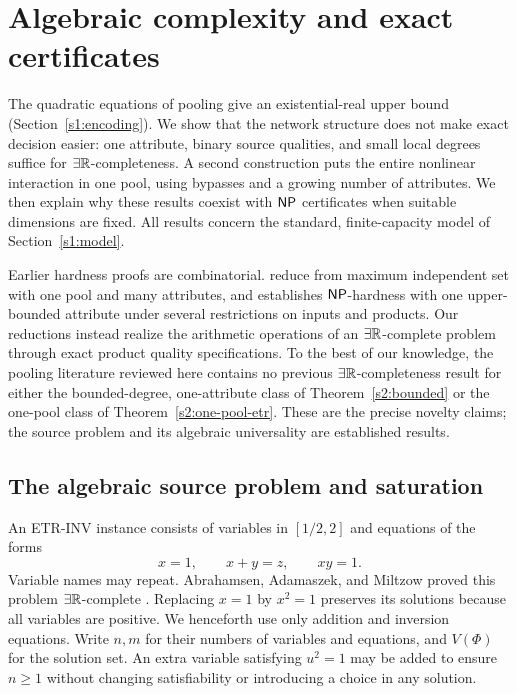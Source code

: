\section{Algebraic complexity and exact certificates}\label{s2:algebraic}

The quadratic equations of pooling give an existential-real upper bound
(Section~\ref{s1:encoding}). We show that the network structure does not
make exact decision easier: one attribute, binary source qualities, and
small local degrees suffice for $\exists\mathbb R$-completeness. A second
construction puts the entire nonlinear interaction in one pool, using
bypasses and a growing number of attributes. We then explain why these
results coexist with $\mathsf{NP}$ certificates when suitable dimensions are
fixed. All results concern the standard, finite-capacity model of
Section~\ref{s1:model}.

Earlier hardness proofs are combinatorial.
\citet{alfaki2013-strong-formulations-for-the-pooling} reduce from
maximum independent set with one pool and many attributes, and
\citet[Theorems~3--5]{haugland2016-the-computational-complexity-of-the}
establishes $\mathsf{NP}$-hardness with one upper-bounded attribute under several
restrictions on inputs and products. Our reductions instead realize the
arithmetic operations of an $\exists\mathbb R$-complete problem through exact product
quality specifications. To the best of our knowledge, the pooling
literature reviewed here contains no previous $\exists\mathbb R$-completeness result
for either the bounded-degree, one-attribute class of
Theorem~\ref{s2:bounded} or the one-pool class of
Theorem~\ref{s2:one-pool-etr}. These are the precise novelty claims; the
source problem and its algebraic universality are established results.

\subsection{The algebraic source problem and saturation}\label{s2:source}

An \textsc{ETR-INV} instance consists of variables in $[1/2,2]$ and
equations of the forms
\begin{equation}
 x=1,\qquad x+y=z,\qquad xy=1.\label{s2:etr-inv}
\end{equation}
Variable names may repeat. Abrahamsen, Adamaszek, and Miltzow proved this
problem $\exists\mathbb R$-complete
\citep[Definition~5 and Theorem~7 of the arXiv version]{abrahamsen2022-the-art-gallery-problem-is}.
Replacing $x=1$ by $x^2=1$ preserves its solutions because all variables
are positive. We henceforth use only addition and inversion equations.
Write $n,m$ for their numbers of variables and equations, and $V(\Phi)$
for the solution set. An extra variable satisfying $u^2=1$ may be added
to ensure $n\ge1$ without changing satisfiability or introducing a choice
in any solution.

